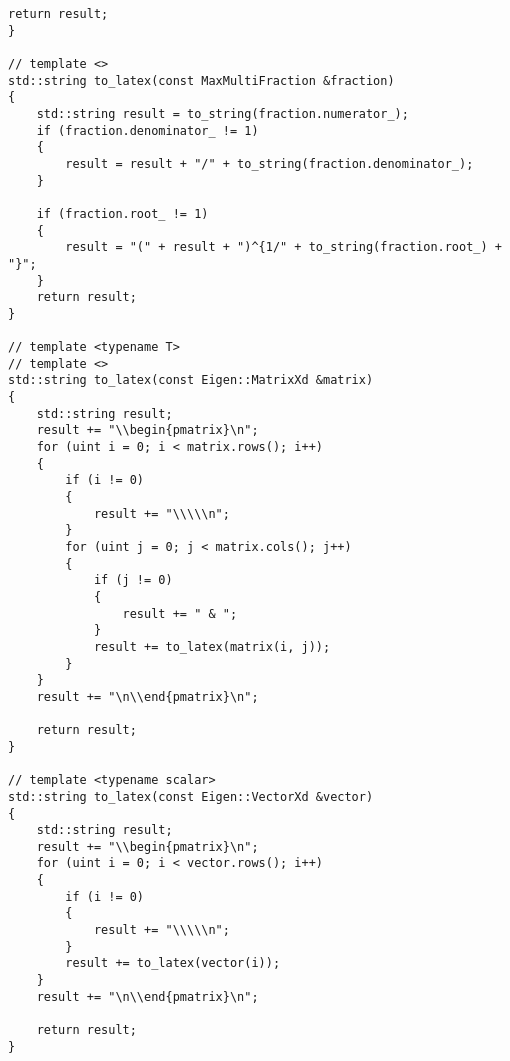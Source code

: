 \begin{lstlisting}[caption=to\_latex.h\label{listing:to_latex}]
    return result;
}

// template <>
std::string to_latex(const MaxMultiFraction &fraction)
{
    std::string result = to_string(fraction.numerator_);
    if (fraction.denominator_ != 1)
    {
        result = result + "/" + to_string(fraction.denominator_);
    }

    if (fraction.root_ != 1)
    {
        result = "(" + result + ")^{1/" + to_string(fraction.root_) + "}";
    }
    return result;
}

// template <typename T>
// template <>
std::string to_latex(const Eigen::MatrixXd &matrix)
{
    std::string result;
    result += "\\begin{pmatrix}\n";
    for (uint i = 0; i < matrix.rows(); i++)
    {
        if (i != 0)
        {
            result += "\\\\\n";
        }
        for (uint j = 0; j < matrix.cols(); j++)
        {
            if (j != 0)
            {
                result += " & ";
            }
            result += to_latex(matrix(i, j));
        }
    }
    result += "\n\\end{pmatrix}\n";

    return result;
}

// template <typename scalar>
std::string to_latex(const Eigen::VectorXd &vector)
{
    std::string result;
    result += "\\begin{pmatrix}\n";
    for (uint i = 0; i < vector.rows(); i++)
    {
        if (i != 0)
        {
            result += "\\\\\n";
        }
        result += to_latex(vector(i));
    }
    result += "\n\\end{pmatrix}\n";

    return result;
}
\end{lstlisting}